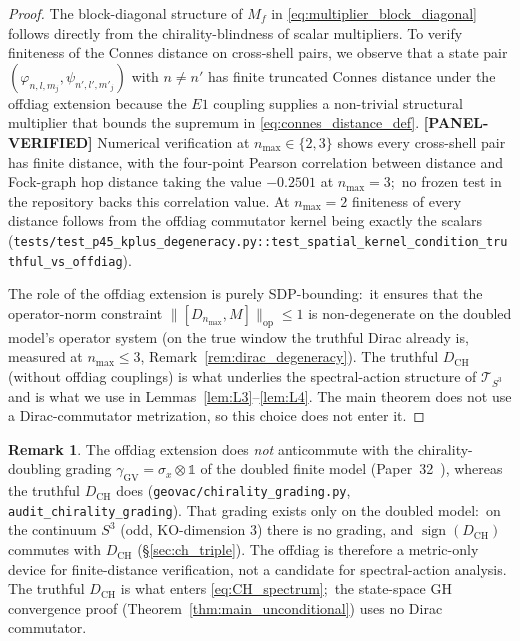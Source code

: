 \documentclass[11pt,a4paper]{article}
\theoremstyle{plain}
\theoremstyle{definition}
\newtheorem{remark}[theorem]{Remark}
\newcommand{\nmax}{n_{\max}}
\newcommand{\sthree}{S^{3}}
\newcommand{\Tcal}{\mathcal{T}}
\newcommand{\opnorm}[1]{\lVert #1 \rVert_{\mathrm{op}}}
\newcommand{\Mat}{M}
\newcommand{\DCH}{D_{\mathrm{CH}}}
\begin{document}
\begin{proof}
The block-diagonal structure of $\Mat_f$ in \eqref{eq:multiplier_block_diagonal}
follows directly from the chirality-blindness of scalar multipliers. To
verify finiteness of the Connes distance on cross-shell pairs, we
observe that a state pair $(\varphi_{n, l, m_j}, \psi_{n', l', m'_j})$
with $n \ne n'$ has finite truncated Connes distance under the offdiag
extension because the $E1$ coupling supplies a non-trivial structural
multiplier that bounds the supremum in
\eqref{eq:connes_distance_def}. \textbf{[PANEL-VERIFIED]} Numerical
verification at
$\nmax \in \{2, 3\}$ shows every cross-shell pair has finite distance,
with the four-point Pearson correlation between distance and Fock-graph
hop distance taking the value $-0.2501$ at $\nmax = 3$;\ no frozen
test in the repository backs this correlation value.  At $\nmax = 2$
finiteness of every distance follows from the offdiag commutator kernel
being exactly the scalars
(\texttt{tests/test\_p45\_kplus\_degeneracy.py::test\_spatial\_kernel\_condition\_truthful\_vs\_offdiag}).

The role of the offdiag extension is purely
SDP-bounding:\ it ensures that the operator-norm constraint
$\opnorm{[D_{\nmax}, M]} \le 1$ is non-degenerate on the doubled
model's operator system (on the true window the truthful Dirac already
is, measured at $\nmax \le 3$, Remark~\ref{rem:dirac_degeneracy}). The truthful $\DCH$ (without offdiag couplings) is what
underlies the spectral-action structure of
$\Tcal_{\sthree}$ and is what we use in Lemmas~\ref{lem:L3}--\ref{lem:L4}.
The main theorem does not use a Dirac-commutator metrization, so
this choice does not enter it.
\end{proof}

\begin{remark}\label{rem:offdiag}
The offdiag extension does \emph{not} anticommute with the
chirality-doubling grading $\gamma_{\mathrm{GV}} = \sigma_x \otimes
\mathbb{1}$ of the doubled finite model (Paper~32~\cite{paper32}),
whereas the truthful $\DCH$ does (\texttt{geovac/chirality\_grading.py},
\texttt{audit\_chirality\_grading}).  That grading exists only on the
doubled model:\ on the continuum $\sthree$ (odd, KO-dimension $3$) there
is no grading, and $\operatorname{sign}(\DCH)$ commutes with $\DCH$
(\S\ref{sec:ch_triple}). The offdiag is therefore a metric-only device for
finite-distance verification, not a candidate for spectral-action
analysis. The truthful $\DCH$ is what enters
\eqref{eq:CH_spectrum};\ the state-space GH convergence proof
(Theorem~\ref{thm:main_unconditional}) uses no Dirac commutator.
\end{remark}
\end{document}
